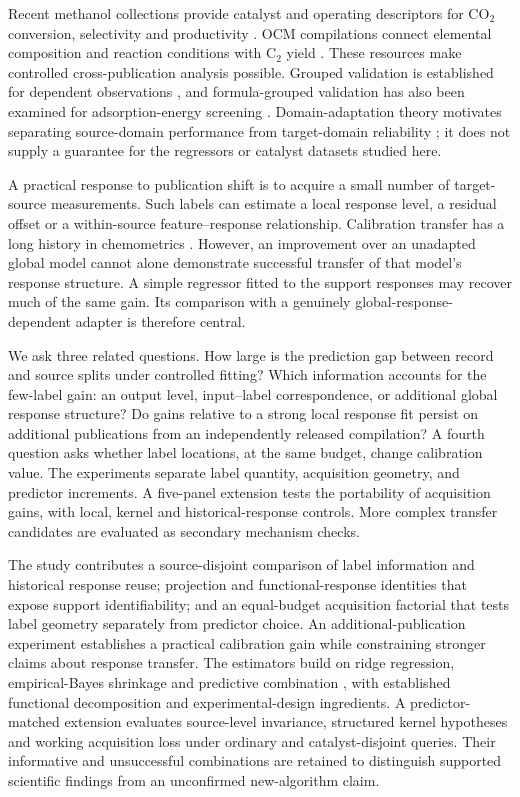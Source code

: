 \documentclass[11pt]{article}
\begin{document}
Recent methanol collections provide catalyst and operating descriptors for CO$_2$ conversion, selectivity and productivity \cite{toldy,yan,suvarna}. OCM compilations connect elemental composition and reaction conditions with C$_2$ yield \cite{schmack,mine}. These resources make controlled cross-publication analysis possible. Grouped validation is established for dependent observations \cite{roberts}, and formula-grouped validation has also been examined for adsorption-energy screening \cite{wu}. Domain-adaptation theory motivates separating source-domain performance from target-domain reliability \cite{bendavid}; it does not supply a guarantee for the regressors or catalyst datasets studied here.

A practical response to publication shift is to acquire a small number of target-source measurements. Such labels can estimate a local response level, a residual offset or a within-source feature--response relationship. Calibration transfer has a long history in chemometrics \cite{feudale}. However, an improvement over an unadapted global model cannot alone demonstrate successful transfer of that model's response structure. A simple regressor fitted to the support responses may recover much of the same gain. Its comparison with a genuinely global-response-dependent adapter is therefore central.

We ask three related questions. How large is the prediction gap between record and source splits under controlled fitting? Which information accounts for the few-label gain: an output level, input--label correspondence, or additional global response structure? Do gains relative to a strong local response fit persist on additional publications from an independently released compilation? A fourth question asks whether label locations, at the same budget, change calibration value. The experiments separate label quantity, acquisition geometry, and predictor increments. A five-panel extension tests the portability of acquisition gains, with local, kernel and historical-response controls. More complex transfer candidates are evaluated as secondary mechanism checks.

The study contributes a source-disjoint comparison of label information and historical response reuse; projection and functional-response identities that expose support identifiability; and an equal-budget acquisition factorial that tests label geometry separately from predictor choice. An additional-publication experiment establishes a practical calibration gain while constraining stronger claims about response transfer. The estimators build on ridge regression, empirical-Bayes shrinkage and predictive combination \cite{efron,breiman}, with established functional decomposition and experimental-design ingredients. A predictor-matched extension evaluates source-level invariance, structured kernel hypotheses and working acquisition loss under ordinary and catalyst-disjoint queries. Their informative and unsuccessful combinations are retained to distinguish supported scientific findings from an unconfirmed new-algorithm claim.
\end{document}
